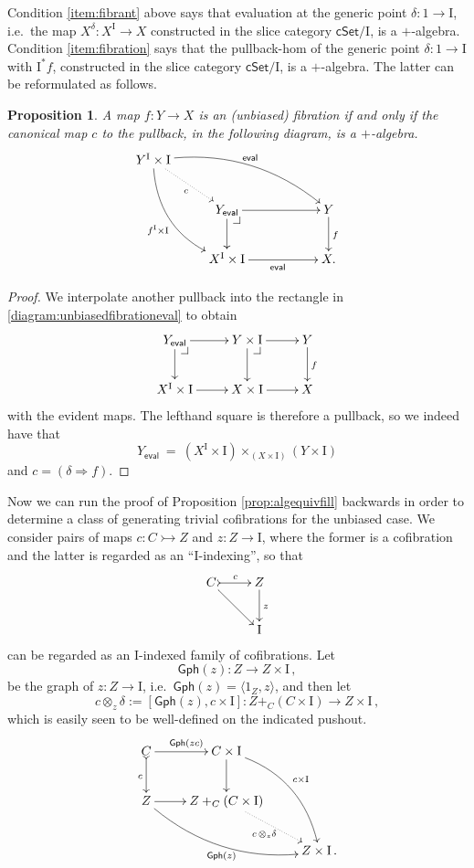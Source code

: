 \documentclass[12pt]{article}
\makeatletter
\newcommand{\cSet}{\ensuremath{\mathsf{cSet}}}
\newcommand{\pbcorner}[1][dr]{\save*!/#1-1.2pc/#1:(-1,1)@^{|-}\restore}
\newcommand{\mono}{\ensuremath{\rightarrowtail}}
\newcommand{\ra}{\ensuremath{\rightarrow}}
\newcommand{\I}{\ensuremath{\mathrm{I}}}
\newtheorem{proposition}[theorem]{Proposition}
\theoremstyle{remark}
\theoremstyle{definition}
\makeatother
\begin{document}
Condition \eqref{item:fibrant} above says that evaluation at the generic point $\delta : 1\ra \I$, i.e.\ the map $X^\delta: X^\I \ra X$ constructed in the slice category $\cSet/\I$, is a $+$-algebra.  
Condition \eqref{item:fibration} says that the pullback-hom of the generic point $\delta : 1\ra \I$ with $\I^*f$, constructed in the slice category $\cSet/\I$, is a $+$-algebra.  The latter can be reformulated as follows.

\begin{proposition}
A map $f : Y\ra X$ is an (unbiased) fibration if and only if the canonical map $c$ to the pullback, in the following diagram, is a $+$-algebra.
\begin{equation}\label{diagram:unbiasedfibrationeval}
\xymatrix{
Y^\I\times \I \ar@/^4ex/ [rrrd]^{\mathsf{eval}} \ar@/_4ex/ [rdd]_{f^\I\times \I} \ar@{..>}[rd]_{c}  && \\
& Y_\mathsf{eval} \pbcorner  \ar[d] \ar[rr] && Y \ar[d]^f \\
& X^\I \times \I \ar[rr]_{\mathsf{eval}} && X.
}
\end{equation}
\end{proposition}
\begin{proof}
We interpolate another pullback into the rectangle in \eqref{diagram:unbiasedfibrationeval} to obtain
\begin{equation}\label{diagram:unbiasedfibrationeval2}
\xymatrix{
 Y_\mathsf{eval} \pbcorner  \ar[d] \ar[r] & Y\times \I \ar[d] \pbcorner \ar[r] & Y \ar[d]^f \\
 X^\I \times \I \ar[r] & X\times \I \ar[r] & X
}
\end{equation}
with the evident maps. The lefthand square is therefore a pullback, so we indeed have that 
\[
Y_\mathsf{eval}\ =\ (X^\I \times \I)\times_{(X\times \I)} (Y\times\I)
\]
and $c = (\delta\Rightarrow\! f)$.
\end{proof}

Now we can run the proof of Proposition \ref{prop:algequivfill} backwards in order to determine a class of generating trivial cofibrations for the unbiased case. We consider pairs of maps $c : C\mono Z$ and $z:Z\ra\I$, where the former is a cofibration and the latter is regarded as an ``$\I$-indexing'', so that
\[
\xymatrix{
C \ar[rd] \ar@{>->}[r]^{c} & Z  \ar[d]^z \\
& \I
}
\]
can be regarded as an $\I$-indexed family of cofibrations.  Let 
\[
\mathsf{Gph}(z) : Z\ra Z\times\I\,,
\]
be the graph of $z : Z\ra \I$, i.e.\ $\mathsf{Gph}(z) = \langle 1_Z, z\rangle$, and then let
\[
c \otimes_z\!\delta := [\mathsf{Gph}(z), c\times\I] : Z+_C(C\times\I) \ra Z\times \I\,,
\]
which is easily seen to be well-defined on the indicated pushout.
\begin{equation}\label{diagram:unbiasedpushoutproduct}
\xymatrix{
C \ar@{>->}[d]_{c} \ar[r]^{\mathsf{Gph}(zc)} & C\times \I \ar[d] \ar@/^4ex/ [rdd]^{c\times\I}\\
Z \ar@/_4ex/ [rrd]_{\mathsf{Gph}(z)} \ar[r] &  Z +_C (C\times\I) \ar@{.>}[rd]_{c\, \otimes_z \delta} \\
&& Z\times\I\,.
}
\end{equation}
\end{document}
